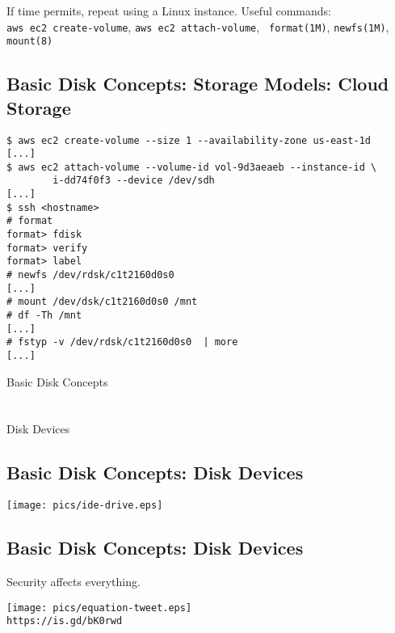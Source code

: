 \documentclass[xga]{xdvislides}
\begin{document}
If time permits, repeat using a Linux instance.
\vspace{.25in}
Useful commands: \\
{\tt aws ec2 create-volume}, {\tt aws ec2 attach-volume}, {\tt
format(1M)}, {\tt newfs(1M)}, {\tt mount(8)}

\subsection{Basic Disk Concepts: Storage Models: Cloud Storage}
\begin{verbatim}
$ aws ec2 create-volume --size 1 --availability-zone us-east-1d
[...]
$ aws ec2 attach-volume --volume-id vol-9d3aeaeb --instance-id \
        i-dd74f0f3 --device /dev/sdh
[...]
$ ssh <hostname>
# format
format> fdisk
format> verify
format> label
# newfs /dev/rdsk/c1t2160d0s0
[...]
# mount /dev/dsk/c1t2160d0s0 /mnt
# df -Th /mnt
[...]
# fstyp -v /dev/rdsk/c1t2160d0s0  | more
[...]
\end{verbatim}


\newpage
\vspace*{\fill}
\begin{center}
	\Hugesize
		Basic Disk Concepts \\ [1em]
	\hspace*{5mm}
	\blueline\\
	\hspace*{5mm}\\
		Disk Devices
\end{center}
\vspace*{\fill}


\subsection{Basic Disk Concepts: Disk Devices}
	\begin{center}
		\texttt{[image: pics/ide-drive.eps]} \\
	\end{center}

\subsection{Basic Disk Concepts: Disk Devices}
Security affects everything. \\
\begin{center}
	\texttt{[image: pics/equation-tweet.eps]} \\
	\verb+https://is.gd/bK0rwd+
\end{center}
\end{document}
